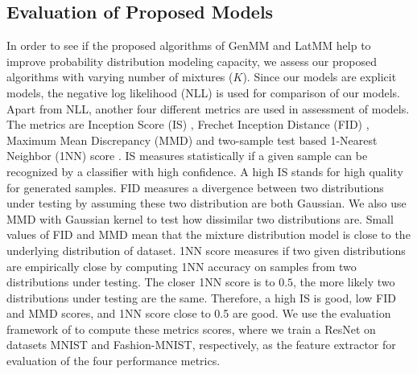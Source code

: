 \subsection{Evaluation of Proposed Models}
In order to see if the proposed algorithms of GenMM and LatMM help to improve probability distribution modeling capacity, we assess our proposed algorithms with varying number of mixtures ($K$). Since our models are explicit models, the negative log likelihood (NLL) is used for comparison of our models. Apart from NLL, another four different metrics are used in assessment of models.
The metrics are Inception Score (IS) \cite{NIPS2016_6125,2018arXiv180101973B,2018arXiv180607755X}, Frechet
Inception Distance (FID) \cite{2017arXiv170608500H}, Maximum Mean
Discrepancy (MMD) \cite{2018arXiv180607755X} and two-sample test based 1-Nearest
Neighbor (1NN) score \cite{2016arXiv161006545L}. IS measures statistically if a given sample can be recognized by a classifier with high confidence. A high IS stands for high quality for generated samples. FID measures a divergence between two distributions under testing by assuming these two distribution are both Gaussian. We also use MMD with Gaussian kernel to test how dissimilar two distributions are.
Small values of FID and MMD mean that the mixture distribution model
is close to the underlying distribution of dataset. 1NN score measures
if two given distributions are empirically close by computing 1NN accuracy
on samples from two distributions under testing. The closer 1NN score is to $0.5$, the more likely 
two distributions under testing are the same. Therefore, a high IS is good, low FID and MMD scores, and 1NN score close to 0.5 are good. We use the evaluation
framework of \cite{2018arXiv180607755X} to compute these metrics scores, where
we train a ResNet on datasets MNIST and Fashion-MNIST, respectively, as the feature extractor for evaluation of the four performance metrics.

